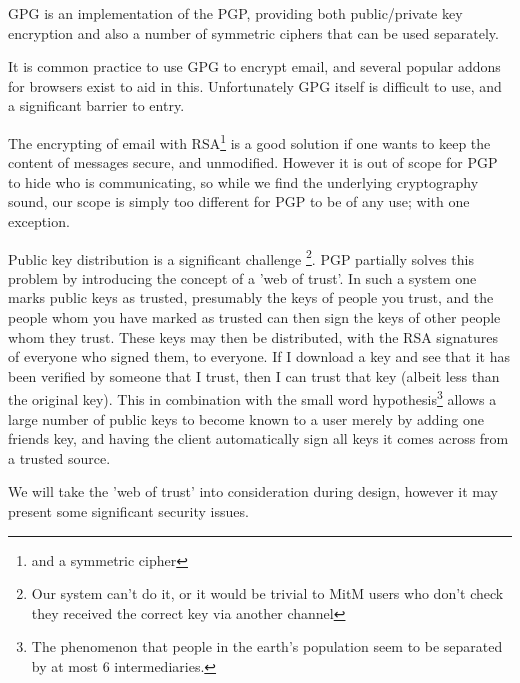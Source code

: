GPG is an implementation of the PGP\cite{rfc4880}, providing both public/private
key encryption and also a number of symmetric ciphers that can be used
separately.

It is common practice to use GPG to encrypt email, and several popular addons
for browsers exist to aid in this\cite{gpgaddon}. Unfortunately GPG itself is
difficult to use\cite{greenwaldAnnoying}, and a significant barrier to entry.

The encrypting of email with RSA\footnote{and a symmetric cipher} is a good
solution if one wants to keep the content of messages secure, and unmodified.
However it is out of scope for PGP to hide who is communicating, so while we
find the underlying cryptography sound, our scope is simply too different for
PGP to be of any use; with one exception.

Public key distribution is a significant challenge \footnote{Our system can't do
it, or it would be trivial to MitM users who don't check they received the
correct key via another channel}. PGP partially solves this problem by
introducing the concept of a 'web of trust'. In such a system one marks public
keys as trusted, presumably the keys of people you trust, and the people whom
you have marked as trusted can then sign the keys of other people whom they
trust. These keys may then be distributed, with the RSA signatures of everyone
who signed them, to everyone. If I download a key and see that it has been
verified by someone that I trust, then I can trust that key (albeit less than
the original key). This in combination with the small word hypothesis\footnote{
The phenomenon that people in the earth's population seem to be separated by at 
most 6 intermediaries.}\cite{sixdegrees} allows a large number of public keys to
become known to a user merely by adding one friends key, and having the client
automatically sign all keys it comes across from a trusted source.

We will take the 'web of trust' into consideration during design, however it
may present some significant security issues.
